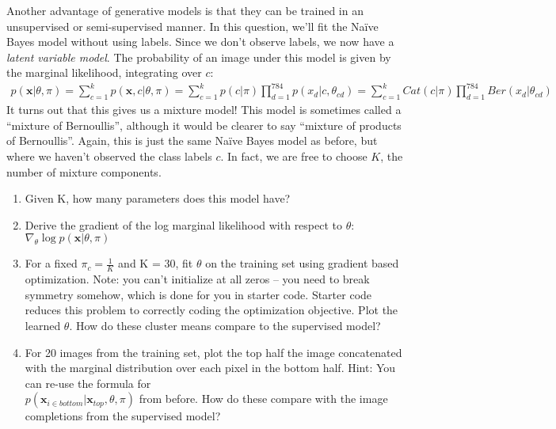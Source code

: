 \documentclass{harvardml}
\newcommand{\bx}{\mathbf{x}}
\newcommand{\btheta}{\boldsymbol{\theta}}
\newcommand{\bpi}{\boldsymbol{\pi}}
\theoremstyle{plain}
\begin{document}
\begin{problem}

Another advantage of generative models is that they can be trained in an unsupervised or semi-supervised manner.  In this question, we'll fit the Na\"ive Bayes model without using labels.  Since we don't observe labels, we now have a \emph{latent variable model}.  The probability of an image under this model is given by the marginal likelihood, integrating over $c$:
\begin{align}
p(\bx | \theta, \pi) = \sum_{c=1}^k p(\bx, c | \theta, \pi) = \sum_{c=1}^k p(c | \pi) \prod_{d=1}^{784} p( x_d | c, \theta_{cd}) = \sum_{c=1}^k Cat(c | \pi) \prod_{d=1}^{784} Ber(x_d | \theta_{cd})
\end{align}
It turns out that this gives us a mixture model! This model is sometimes called a ``mixture of Bernoullis'', although it would be clearer to say ``mixture of products of Bernoullis''.  Again, this is just the same Na\"ive Bayes model as before, but where we haven't observed the class labels $c$.  In fact, we are free to choose $K$, the number of mixture components.
\begin{enumerate}[label=(\alph*)]
\item Given K, how many parameters does this model have?
\item Derive the gradient of the log marginal likelihood with respect to $\theta$: $\nabla_\theta \log p(\bx | \theta, \pi)$
\item For a fixed $\pi_c = \frac{1}{K}$ and K = 30, fit $\theta$ on the training set using gradient based optimization.  Note: you can't initialize at all zeros -- you need to break symmetry somehow, which is done for you in starter code. Starter code reduces this problem to correctly coding the optimization objective. Plot the learned $\theta$.  How do these cluster means compare to the supervised model?
\item For 20 images from the training set, plot the top half the image concatenated with the marginal distribution over each pixel in the bottom half.
Hint: You can re-use the formula for \\ $p(\bx_{i \in bottom}|\bx_{top}, \theta, \pi)$ from before.  How do these compare with the image completions from the supervised model?
\end{enumerate}
\end{problem}



\end{document}
